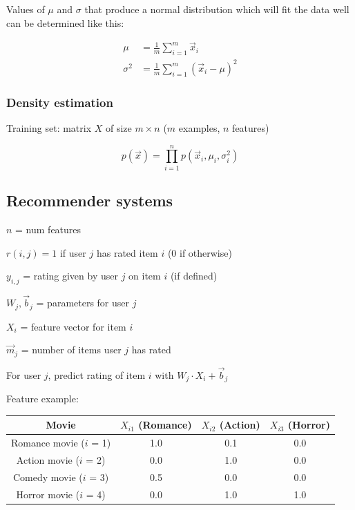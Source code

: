 \documentclass[12pt]{article}
\begin{document}
Values of $\mu$ and $\sigma$ that produce a normal distribution which will fit the data well can be determined
like this:

\begin{align*}
    \mu &= \frac{1}{m} \sum_{i=1}^m \vec{x}_i\\
    \sigma^2 &= \frac{1}{m} \sum_{i=1}^m (\vec{x}_i - \mu)^2
\end{align*}

\subsubsection{Density estimation}

Training set: matrix $X$ of size $m \times n$ ($m$ examples, $n$ features)

\[ p(\vec{x}) = \prod_{i=1}^n p(\vec{x}_i,\mu_i,\sigma_i^2) \]

\subsection{Recommender systems}

$n$ = num features

$r(i,j) = 1$ if user $j$ has rated item $i$ (0 if otherwise)

$y_{i,j}$ = rating given by user $j$ on item $i$ (if defined)

$W_j,\vec{b}_j$ = parameters for user $j$

$X_i$ = feature vector for item $i$

$\vec{m}_j$ = number of items user $j$ has rated

For user $j$, predict rating of item $i$ with $W_j \cdot X_i + \vec{b}_j$

Feature example:

\begin{center}
    \begin{tabular}{ ||c|c|c|c|| }
        \hline
        Movie & $X_{i1}$ (Romance) & $X_{i2}$ (Action) & $X_{i3}$ (Horror)\\
        \hline
        Romance movie ($i$ = 1) & 1.0 & 0.1 & 0.0\\
        Action movie ($i$ = 2) & 0.0 & 1.0 & 0.0\\
        Comedy movie ($i$ = 3) & 0.5 & 0.0 & 0.0\\
        Horror movie ($i$ = 4) & 0.0 & 1.0 & 1.0\\
        \hline
    \end{tabular}
\end{center}
\end{document}
